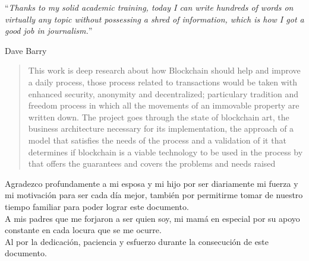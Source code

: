 \documentclass[
11pt, %
spanish, %
singlespacing, %
headsepline, %
]{MastersDoctoralThesis} %
\begin{document}
\cleardoublepage


\vspace*{0.2\textheight}

\noindent\enquote{\itshape Thanks to my solid academic training, today I can write hundreds of words on virtually any topic without possessing a shred of information, which is how I got a good job in journalism.}\bigbreak

\hfill Dave Barry


\begin{abstract}
\addchaptertocentry{\abstractname} %
This work is deep research about how Blockchain should help and improve a daily process, those process related to transactions would be taken with enhanced security, anonymity and decentralized; particulary tradition and freedom process in which all the movements of an immovable property are written down. The project goes through the state of blockchain art, the business architecture necessary for its implementation, the approach of a model that satisfies the needs of the process and a validation of it that determines if blockchain is a viable technology to be used in the process by that offers the guarantees and covers the problems and needs raised  
\end{abstract}


\begin{acknowledgements}
\addchaptertocentry{\acknowledgementname} %
Agradezco profundamente a mi esposa y mi hijo por ser diariamente mi fuerza y mi motivación para ser cada día mejor, también por permitirme tomar de nuestro tiempo familiar para poder lograr este documento.
\\
A mis padres que me forjaron a ser quien soy, mi mamá en especial por su apoyo constante en cada locura que se me ocurre.
\\
Al {\supname} por la dedicación, paciencia y esfuerzo durante la consecución de este documento.
\end{acknowledgements}
\end{document}
